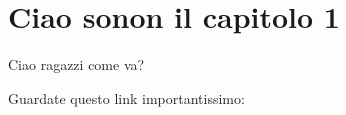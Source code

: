 \chapter{Ciao sonon il capitolo 1}

Ciao ragazzi come va?

Guardate questo link importantissimo: \cite{provaBibliografia}